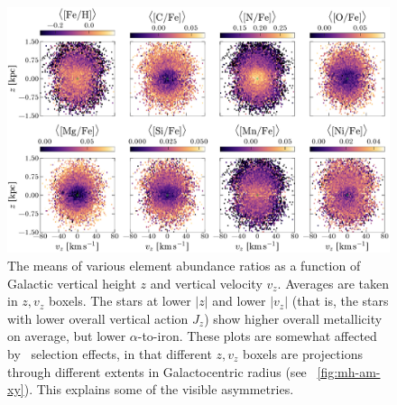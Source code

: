 \documentclass[modern]{aastex63}
\newcommand{\apogee}{\acronym{APOGEE}}
\begin{document}
\begin{figure}[!tp]
  \begin{mdframed}
  \color{captiongray}
  \begin{center}
  \includegraphics[width=\textwidth]{abundance-zvz-grid.pdf}
  \end{center}
  \caption{%
    The means of various element abundance ratios as a function of Galactic
    vertical height $z$ and vertical velocity $v_z$.
    Averages are taken in $z, v_z$ boxels.
    The stars at lower $|z|$ and lower $|v_z|$ (that is, the stars with
    lower overall vertical action $J_z$) show higher overall metallicity
    on average, but lower $\alpha$-to-iron.
    These plots are somewhat affected by \apogee\ selection effects, in
    that different $z, v_z$ boxels are projections through different extents
    in Galactocentric radius (see \figurename~\ref{fig:mh-am-xy}).
    This explains some of the visible asymmetries.
  \label{fig:zvz-grid}
  }
  \end{mdframed}
\end{figure}
\end{document}
